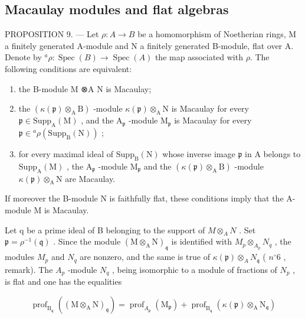 \subsection{Macaulay modules and flat algebras}

PROPOSITION 9. — Let \(\rho: A \to B\) be a homomorphism of Noetherian rings, M a finitely generated A-module and N a finitely generated B-module, flat over A. Denote by \({}^{a}\rho: \operatorname{Spec}(B) \longrightarrow \operatorname{Spec}(A)\) the map associated with \(\rho\). The following conditions are equivalent:

\begin{enumerate}
\def\labelenumi{(\roman{enumi})}
\item
  the B-module M ⊗A N is Macaulay;
\item
  the \((\kappa(\mathfrak{p})\otimes_{\mathrm{A}}\mathrm{B})\) -module \(\kappa(\mathfrak{p})\otimes_{\mathrm{A}}\mathrm{N}\) is Macaulay for every \(\mathfrak{p}\in\mathrm{Supp}_{\mathrm{A}}(\mathrm{M})\) , and the \(\mathrm{A}_{\mathfrak{p}}\) -module \(\mathrm{M}_{\mathfrak{p}}\) is Macaulay for every \(\mathfrak{p}\in{}^{a}\rho(\mathrm{Supp}_{\mathrm{B}}(\mathrm{N}))\) ;
\item
  for every maximal ideal of \(\mathrm{Supp}_{\mathrm{B}}(\mathrm{N})\) whose inverse image \(\mathfrak{p}\) in A belongs to \(\mathrm{Supp}_{\mathrm{A}}(\mathrm{M})\) , the \(\mathrm{A}_{\mathfrak{p}}\) -module \(\mathrm{M}_{\mathfrak{p}}\) and the \((\kappa(\mathfrak{p}) \otimes_{\mathrm{A}} \mathrm{B})\) -module \(\kappa(\mathfrak{p}) \otimes_{\mathrm{A}} \mathrm{N}\) are Macaulay.
\end{enumerate}

If moreover the B-module N is faithfully flat, these conditions imply that the A-module M is Macaulay.

Let q be a prime ideal of B belonging to the support of \(M \otimes_{A} N\) . Set \(\mathfrak{p} = \rho^{-1}(\mathfrak{q})\) . Since the module \((\mathrm{M} \otimes_{\mathrm{A}} \mathrm{N})_{\mathfrak{q}}\) is identified with \(M_{p} \otimes_{A_{p}} N_{q}\) , the modules \(M_{p}\) and \(N_{q}\) are nonzero, and the same is true of \(\kappa(\mathfrak{p}) \otimes_{A} N_{\mathfrak{q}}\) ( \(n^{\circ} 6\) , remark). The \(A_{p}\) -module \(N_{q}\) , being isomorphic to a module of fractions of \(N_{p}\) , is flat and one has the equalities

\[
\operatorname{prof} _ {\mathrm{B} _ {\mathfrak {q}}} \left(\left(\mathrm{M} \otimes_ {\mathrm{A}} \mathrm{N}\right) _ {\mathfrak {q}}\right) = \operatorname{prof} _ {A_ {\mathfrak {p}}} \left(\mathrm{M} _ {\mathfrak {p}}\right) + \operatorname{prof} _ {\mathrm{B} _ {\mathfrak {q}}} (\kappa (\mathfrak {p}) \otimes_ {\mathrm{A}} \mathrm{N} _ {\mathfrak {q}})
\]

